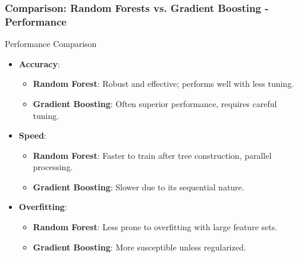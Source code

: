 \documentclass[aspectratio=169]{beamer}
\begin{document}
\begin{frame}[fragile]
    \frametitle{Comparison: Random Forests vs. Gradient Boosting - Performance}
    \begin{block}{Performance Comparison}
        \begin{itemize}
            \item \textbf{Accuracy}:
                \begin{itemize}
                    \item \textbf{Random Forest}: Robust and effective; performs well with less tuning.
                    \item \textbf{Gradient Boosting}: Often superior performance, requires careful tuning.
                \end{itemize}
            \item \textbf{Speed}:
                \begin{itemize}
                    \item \textbf{Random Forest}: Faster to train after tree construction, parallel processing.
                    \item \textbf{Gradient Boosting}: Slower due to its sequential nature.
                \end{itemize}
            \item \textbf{Overfitting}:
                \begin{itemize}
                    \item \textbf{Random Forest}: Less prone to overfitting with large feature sets.
                    \item \textbf{Gradient Boosting}: More susceptible unless regularized.
                \end{itemize}
        \end{itemize}
    \end{block}
\end{frame}
\end{document}
